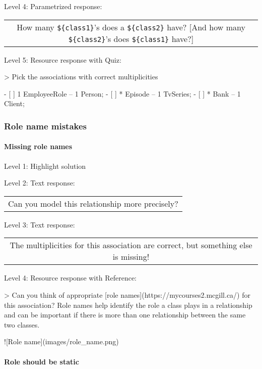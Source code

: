 \noindent Level 4: Parametrized response: \medskip

\begin{tabular}{|c}
How many \verb|${class1}|'s does a \verb|${class2}| have? [And how many \verb|${class2}|'s does \verb|${class1}| have?]
\end{tabular} \medskip

\noindent Level 5: Resource response with Quiz:

> Pick the associations with correct multiplicities

- [ ] 1 EmployeeRole -- 1 Person;
- [ ] * Episode -- 1 TvSeries;
- [ ] * Bank -- 1 Client;


\subsubsection{Role name mistakes}

\paragraph{Missing role names}

\noindent Level 1: Highlight solution \medskip

\noindent Level 2: Text response: \medskip

\begin{tabular}{|c}
Can you model this relationship more precisely?
\end{tabular} \medskip

\noindent Level 3: Text response: \medskip

\begin{tabular}{|c}
The multiplicities for this association are correct, but something else is missing!
\end{tabular} \medskip

\noindent Level 4: Resource response with Reference:

> Can you think of appropriate [role names](https://mycourses2.mcgill.ca/)
for this association? Role names help identify the role a class plays in a
relationship and can be important if there is more than one relationship
between the same two classes.

![Role name](images/role_name.png)



\paragraph{Role should be static}

